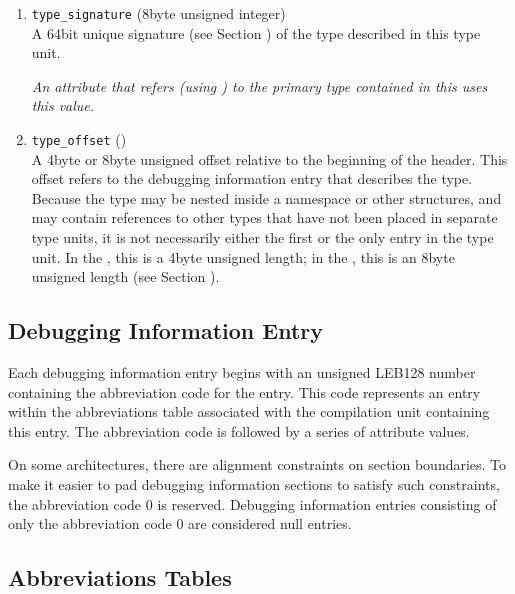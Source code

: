 \begin{enumerate}[1. ]
\item \texttt{type\_signature} (8\dash byte unsigned integer) \\
A 
64\dash bit unique signature (see Section 
)
of the type described in this type
unit.  

\textit{An attribute that refers (using 
) to
the primary type contained in this 
 uses this value.}

\item \texttt{type\_offset} () \\
A 4\dash byte or 8\dash byte unsigned offset 
relative to the beginning
of the  header.
This offset refers to the debugging
information entry that describes the type. Because the type
may be nested inside a namespace or other structures, and may
contain references to other types that have not been placed in
separate type units, it is not necessarily either the first or
the only entry in the type unit. In the \thirtytwobitdwarfformat,
this is a 4\dash byte unsigned length; in the \sixtyfourbitdwarfformat,
this is an 8\dash byte unsigned length
(see Section ).

\end{enumerate}

\subsection{Debugging Information Entry}
\label{datarep:debugginginformationentry}

Each debugging information entry begins with an unsigned LEB128
number containing the abbreviation code for the entry. This
code represents an entry within the abbreviations table
associated with the compilation unit containing this entry. The
abbreviation code is followed by a series of attribute values.

On some architectures, there are alignment constraints on
section boundaries. To make it easier to pad debugging
information sections to satisfy such constraints, the
abbreviation code 0 is reserved. Debugging information entries
consisting of only the abbreviation code 0 are considered
null entries.

\subsection{Abbreviations Tables}
\label{datarep:abbreviationstables}

